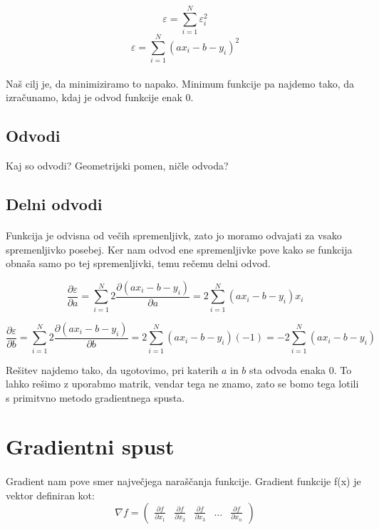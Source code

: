\documentclass[a4paper, 12pt]{article}
\begin{document}
	$$\varepsilon = \sum_{i=1}^{N} \varepsilon_i^2$$
	$$\varepsilon = \sum_{i=1}^{N} (a x_i - b - y_i)^2$$

	\paragraph{}
	Naš cilj je, da minimiziramo to napako. Minimum funkcije pa najdemo tako, da izračunamo, kdaj je odvod funkcije enak 0.

	\subsection*{Odvodi}
	Kaj so odvodi? Geometrijski pomen, ničle odvoda?

	\subsection*{Delni odvodi}
	\paragraph{}
	Funkcija je odvisna od večih spremenljivk, zato jo moramo odvajati za vsako spremenljivko posebej. Ker nam odvod ene spremenljivke pove kako se funkcija obnaša samo po tej spremenljivki, temu rečemu delni odvod.
	

	$$\frac{\partial \varepsilon}{\partial a} =
		\sum_{i=1}^{N} 2 \frac{\partial (a x_i - b - y_i)}{\partial a} =
		2 \sum_{i=1}^{N} (a x_i - b - y_i)x_i$$

	$$\frac{\partial \varepsilon}{\partial b} =
		\sum_{i=1}^{N} 2 \frac{\partial (a x_i - b - y_i)}{\partial b} =
		2 \sum_{i=1}^{N} (a x_i - b - y_i)(-1) = -2 \sum_{i=1}^{N} (a x_i - b - y_i)$$

	Rešitev najdemo tako, da ugotovimo, pri katerih $a$ in $b$ sta odvoda enaka 0. To lahko rešimo z uporabmo matrik, vendar tega ne znamo, zato se bomo tega lotili s primitvno metodo gradientnega spusta.
	
	\section*{Gradientni spust}
	\paragraph{}
	Gradient nam pove smer največjega naraščanja funkcije. Gradient funkcije f(x) je vektor definiran kot:
	$$\nabla f = \begin{pmatrix}\frac{\partial f}{\partial x_{1}} & \frac{\partial f}{\partial x_{2}} & \frac{\partial f}{\partial x_{3}} & ... & \frac{\partial f}{\partial x_{n}}\end{pmatrix}$$
	
\end{document}

